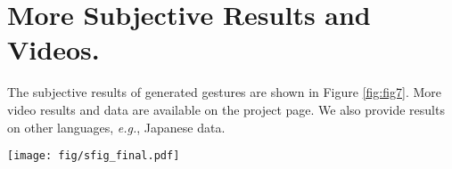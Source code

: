 \documentclass[runningheads]{llncs}
\begin{document}
\section{More Subjective Results and Videos.}
The subjective results of generated gestures are shown in Figure \ref{fig:fig7}. More video results and data are available on the project page. We also provide results on other languages, \textit{e.g.}, Japanese data.

\begin{figure*}[]

\begin{center}
\texttt{[image: fig/sfig\_final.pdf]}
\end{center}
\caption{
\textbf{Results Visualization.} Ground truth (top) and generated results with neutral (middle) and fear (down) emotions. 
}
\label{fig:fig7}
\end{figure*} 
\end{document}
